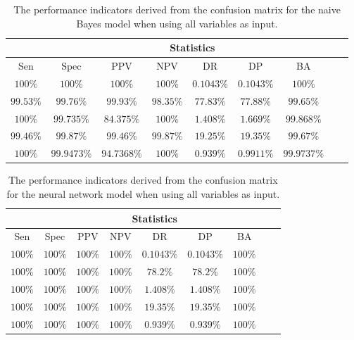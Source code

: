 \begin{table}[!ht]
	\centering
	\begin{tabular}{|c|c|c|c|c|c|c|c|c|}
		\hline
		 & \multicolumn{7}{c|}{Statistics} \\ \hline
		Sen & Spec & PPV & NPV & DR & DP & BA \\ \hline
		$100\%$ & $100\%$ & $100\%$ & $100\%$ & $0.1043\%$ & $0.1043\%$ & $100\%$ \\ \hline
		$99.53\%$ & $99.76\%$ & $99.93\%$ & $98.35\%$ & $77.83\%$ & $77.88\%$ & $99.65\%$ \\ \hline
		$100\%$ & $99.735\%$ & $84.375\%$ & $100\%$ & $1.408\%$ & $1.669\%$ & $99.868\%$ \\ \hline
		$99.46\%$ & $99.87\%$ & $99.46\%$ & $99.87\%$ & $19.25\%$ & $19.35\%$ & $99.67\%$ \\ \hline
		$100\%$ & $99.9473\%$ & $94.7368\%$ & $100\%$ & $0.939\%$ & $0.9911\%$ & $99.9737\%$ \\ \hline
	\end{tabular}
	\caption{The performance indicators derived from the confusion matrix for the naive Bayes model when using all variables as input.}
	\label{tab:cs:all:nb}
\end{table}

\begin{table}[!ht]
	\centering
	\begin{tabular}{|c|c|c|c|c|c|c|c|c|}
		\hline
		 & \multicolumn{7}{c|}{Statistics} \\ \hline
		Sen & Spec & PPV & NPV & DR & DP & BA \\ \hline
		$100\%$ & $100\%$ & $100\%$ & $100\%$ & $0.1043\%$ & $0.1043\%$ & $100\%$ \\ \hline
		$100\%$ & $100\%$ & $100\%$ & $100\%$ & $78.2\%$ & $78.2\%$ & $100\%$ \\ \hline
		$100\%$ & $100\%$ & $100\%$ & $100\%$ & $1.408\%$ & $1.408\%$ & $100\%$ \\ \hline
		$100\%$ & $100\%$ & $100\%$ & $100\%$ & $19.35\%$ & $19.35\%$ & $100\%$ \\ \hline
		$100\%$ & $100\%$ & $100\%$ & $100\%$ & $0.939\%$ & $0.939\%$ & $100\%$ \\ \hline
	\end{tabular}
	\caption{The performance indicators derived from the confusion matrix for the neural network model when using all variables as input.}
	\label{tab:cs:all:nnet}
\end{table}

